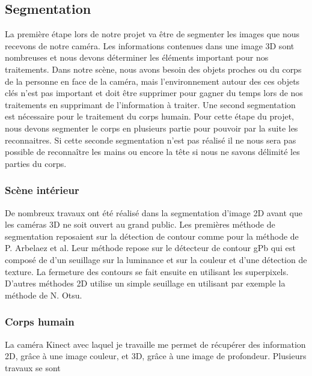 \subsection{Segmentation}
La première étape lors de notre projet va être de segmenter les images que nous recevons de 
notre caméra. Les informations contenues dans une image 3D sont nombreuses et nous devons
déterminer les éléments important pour nos traitements. Dans notre scène,
nous avons besoin des objets proches ou du corps de la personne en face de la caméra, mais 
l'environnement autour des ces objets clés n'est pas important et doit être supprimer pour
gagner du temps lors de nos traitements en supprimant de l'information à traiter.
Une second segmentation est nécessaire pour le traitement du corps humain. Pour cette étape du projet,
nous devons segmenter le corps en plusieurs partie pour pouvoir par la suite les reconnaitres. Si cette
seconde segmentation n'est pas réalisé il ne nous sera pas possible de reconnaître les mains ou encore
la tête si nous ne savons délimité les parties du corps.  
 
\subsubsection{Scène intérieur}
De nombreux travaux ont été réalisé dans la segmentation d'image 2D avant que les caméras 3D ne soit
ouvert au grand public. Les premières méthode de segmentation reposaient sur la détection de contour
comme pour la méthode de P. Arbelaez et al\cite{2DSegmentation1}. Leur méthode repose sur le détecteur
de contour gPb qui est composé de d'un seuillage sur la luminance et sur la couleur et d'une détection
de texture. La fermeture des contours se fait ensuite en utilisant les superpixels. D'autres méthodes
2D utilise un simple seuillage en utilisant par exemple la méthode de N. Otsu\cite{Otsu}.

\subsubsection{Corps humain}
La caméra Kinect avec laquel je travaille me permet de récupérer des information 2D, grâce à une image
couleur, et 3D, grâce à une image de profondeur. Plusieurs travaux se sont 

